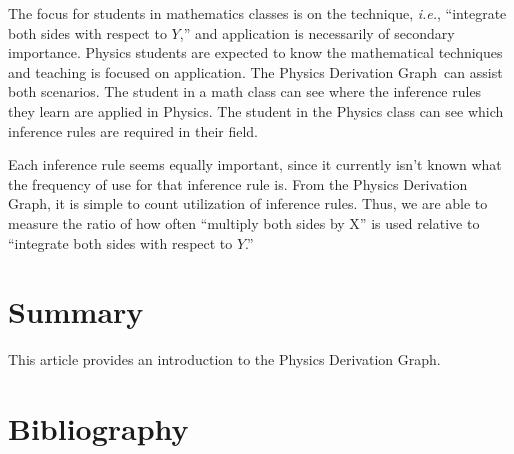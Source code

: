 \documentclass{article}
\newcommand{\ie}{\textit{i.e.}} %
\newcommand{\pdg}{Physics Derivation Graph}
\begin{document}
\begin{multicols}{2}
The focus for students in mathematics classes is on the technique, \ie, ``integrate both sides with respect to $Y$,'' and application is necessarily of secondary importance. Physics students are expected to know the mathematical techniques and teaching is focused on application. The \pdg\ can assist both scenarios. The student in a math class can see where the inference rules they learn are applied in Physics. The student in the Physics class can see which inference rules are required in their field. 

Each inference rule seems equally important, since it currently isn't known what the frequency of use for that inference rule is. From the \pdg, it is simple to count utilization of inference rules. Thus, we are able to measure the ratio of how often ``multiply both sides by X'' is used relative to ``integrate both sides with respect to $Y$.'' 

\section{Summary\label{sec:summary}}
This article provides an introduction to the \pdg. 

\section{Bibliography}


\end{multicols}

\newpage
\appendix
%
\end{document}
